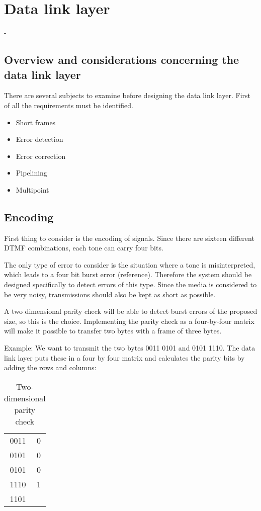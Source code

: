 \section{Data link layer}  -
\subsection{Overview and considerations concerning the data link layer}
There are several subjects to examine before designing the data link layer.
First of all the requirements must be identified. 
\begin{itemize}
	\item 	Short frames
	\item	Error detection
	\item	Error correction
	\item	Pipelining
	\item 	Multipoint
\end{itemize}

\subsection{Encoding}
First thing to consider is the encoding of signals. Since there are sixteen
different DTMF combinations, each tone can carry four bits.

The only type of error to consider is the situation where a tone is
misinterpreted, which leads to a four bit burst error (reference). Therefore the
system should be designed specifically to detect errors of this type. Since the media
is considered to be very noisy, transmissions should also be kept as short as
possible.

A two dimensional parity check will be able to detect burst errors of the
proposed size, so this is the choice. Implementing the parity check as a
four-by-four matrix will make it possible to transfer two bytes with a frame of
three bytes.

Example: We want to transmit the two bytes 0011 0101 and 0101 1110. The data
link layer puts these in a four by four matrix and calculates the parity bits by
adding the rows and columns:

\begin{table}[htb]
	\begin{center}
	\begin{tabular}{c|c}
	0011 & 0 \\
	0101 & 0 \\
	0101 & 0 \\
	1110 & 1 \\
	\hline
	1101 & \\
	\end{tabular}
	\end{center}
	\caption{Two-dimensional parity check}
	\label{tab:two_dimensional_parity_check}
\end{table}

